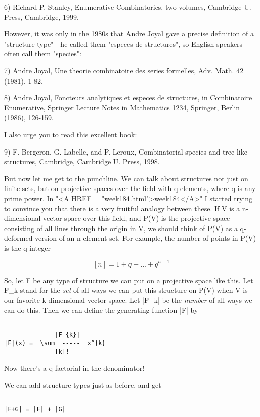 6) Richard P. Stanley, Enumerative Combinatorics, two volumes, 
Cambridge U. Press, Cambridge, 1999.

However, it was only in the 1980s that Andre Joyal gave a precise
definition of a "structure type" - he called them "especes de structures",
so English speakers often call them "species":

7) Andre Joyal, Une theorie combinatoire des series formelles,
Adv. Math. 42 (1981), 1-82.

8) Andre Joyal, Foncteurs analytiques et especes de structures, 
in Combinatoire Enumerative, Springer Lecture Notes in Mathematics
1234, Springer, Berlin (1986), 126-159.

I also urge you to read this excellent book:

9) F. Bergeron, G. Labelle, and P. Leroux, Combinatorial species and
tree-like structures, Cambridge, Cambridge U. Press, 1998.

But now let me get to the punchline.  We can talk about structures not
just on finite sets, but on projective spaces over the field with  
q elements, where q is any prime power.  In "<A HREF = "week184.html">week184</A>" I started trying 
to convince you that there is a very fruitful analogy between these.
If V is a n-dimensional vector space over this field, and P(V) is the
projective space consisting of all lines through the origin in V, we
should think of P(V) as a q-deformed version of an n-element set.  For
example, the number of points in P(V) is the q-integer


$$

[n] = 1 + q + ... + q^{n-1}
$$
    

So, let F be any type of structure we can put on a projective space like
this.  Let F_{k} stand for the \emph{set} 
of all ways we can put this structure
on P(V) when V is our favorite k-dimensional vector space.  Let |F_{k}| be
the \emph{number} of all ways we can do this.  Then we can define the
generating function |F| by


\begin{verbatim}

              |F_{k}| 
|F|(x) =  \sum  -----  x^{k}
              [k]!

\end{verbatim}
    
Now there's a q-factorial in the denominator! 

We can add structure types just as before, and get


\begin{verbatim}

|F+G| = |F| + |G|
\end{verbatim}
    
